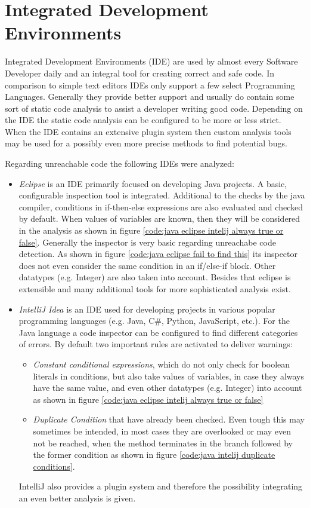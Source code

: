 \section{Integrated Development Environments}
\label{sec:intelliJ}
Integrated Development Environments (IDE) are used by almost every Software Developer daily and an integral tool for creating correct and safe code.
In comparison to simple text editors IDEs only support a few select Programming Languages. Generally they provide better support and usually do contain some sort of static code analysis to assist a developer writing good code. 
Depending on the IDE the static code analysis can be configured to be more or less strict. 
When the IDE contains an extensive plugin system then custom analysis tools may be used for a possibly even more precise methods to find potential bugs.


Regarding unreachable code the following IDEs were analyzed:
\begin{itemize}
	\item \emph{Eclipse} \cite{incCommunityOpenInnovation}is an IDE primarily focused on developing Java projects. A basic, configurable inspection tool is integrated. Additional to the checks by the java compiler, conditions in if-then-else expressions are also evaluated and checked by default. When values of variables are known, then they will be considered in the analysis as shown in figure \ref{code:java eclipse intelij always true or false}. Generally the inspector is very basic regarding unreachabe code detection. As shown in figure \ref{code:java eclipse fail to find this} its inspector does not even consider the same condition in an if/else-if block. Other datatypes (e.g. Integer) are also taken into account. Besides that eclipse is extensible and many additional tools for more sophisticated analysis exist.
	\item \emph{IntelliJ Idea} \cite{IntelliJIDEACapable} is an IDE used for developing projects in various popular programming languages (e.g. Java, C\#, Python, JavaScript, etc.). For the Java language a code inspector can be configured to find different categories of errors. By default two important rules are activated to deliver warnings: 
	\begin{itemize}
		\item \emph{Constant conditional expressions}, which do not only check for boolean literals in conditions, but also take values of variables, in case they always have the same value, and even other datatypes (e.g. Integer) into account as shown in figure \ref{code:java eclipse intelij always true or false}
		\item \emph{Duplicate Condition} that have already been checked. Even tough this may sometimes be intended, in most cases they are overlooked or may even not be reached, when the method terminates in the branch followed by the former condition as shown in figure \ref{code:java intelij duplicate conditions}. 
	\end{itemize}
	IntelliJ also provides a plugin system and therefore the possibility integrating an even better analysis is given.
\end{itemize}


